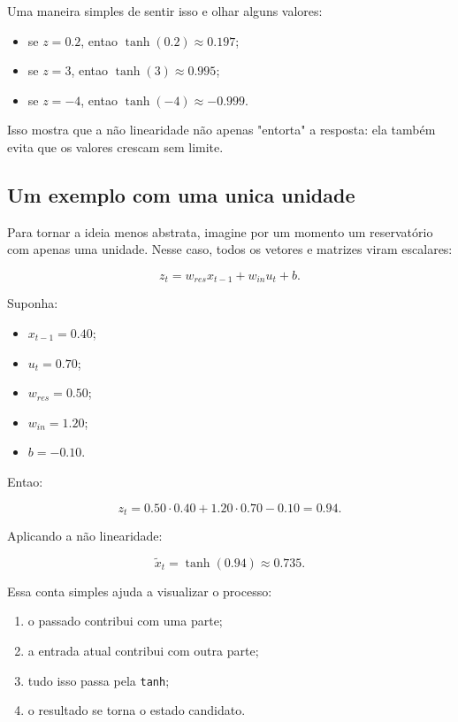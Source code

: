 \documentclass[12pt]{article}
\providecommand{\tightlist}{%
  \setlength{\itemsep}{0pt}\setlength{\parskip}{0pt}}
\begin{document}
Uma maneira simples de sentir isso e olhar alguns valores:

\begin{itemize}
\tightlist
\item
  se \(z = 0.2\), entao \(\tanh(0.2) \approx 0.197\);
\item
  se \(z = 3\), entao \(\tanh(3) \approx 0.995\);
\item
  se \(z = -4\), entao \(\tanh(-4) \approx -0.999\).
\end{itemize}

Isso mostra que a não linearidade não apenas "entorta" a resposta: ela também evita que os valores crescam sem limite.

\subsection{Um exemplo com uma unica unidade}\label{35-um-exemplo-com-uma-unica-unidade}

Para tornar a ideia menos abstrata, imagine por um momento um reservatório com apenas uma unidade. Nesse caso, todos os vetores e matrizes viram escalares:

\[
z_t = w_{res} x_{t-1} + w_{in} u_t + b.
\]

Suponha:

\begin{itemize}
\tightlist
\item
  \(x_{t-1} = 0.40\);
\item
  \(u_t = 0.70\);
\item
  \(w_{res} = 0.50\);
\item
  \(w_{in} = 1.20\);
\item
  \(b = -0.10\).
\end{itemize}

Entao:

\[
z_t = 0.50 \cdot 0.40 + 1.20 \cdot 0.70 - 0.10 = 0.94.
\]

Aplicando a não linearidade:

\[
\widetilde{x}_t = \tanh(0.94) \approx 0.735.
\]

Essa conta simples ajuda a visualizar o processo:

\begin{enumerate}
\def\labelenumi{\arabic{enumi}.}
\tightlist
\item
  o passado contribui com uma parte;
\item
  a entrada atual contribui com outra parte;
\item
  tudo isso passa pela \texttt{tanh};
\item
  o resultado se torna o estado candidato.
\end{enumerate}
\end{document}
